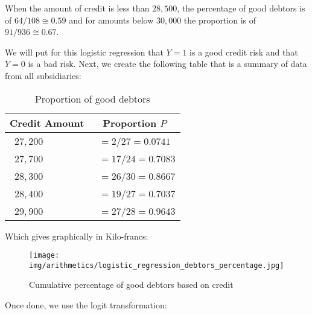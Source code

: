 	When the amount of credit is less than $28,500$, the percentage of good debtors is of $64/108 \cong 0.59$ and for amounts below $30,000$ the proportion is of $91/936\cong 0.67$.
	
	We will put for this logistic regression that $Y=1$ is a good credit risk and that $Y=0$ is a bad risk. Next, we create the following table that is a summary of data from all subsidiaries:
	\begin{table}[H]
		\begin{center}
			\begin{tabular}{|p{2cm}|p{4cm}|}
					\hline
					\multicolumn{1}{c}{\cellcolor{black!30}\textbf{Credit Amount}} & 
	  \multicolumn{1}{c}{\cellcolor{black!30}\textbf{Proportion $P$}} \\ \hline
					\centering\arraybackslash\ $27,200$ & \centering\arraybackslash\ $=2/27=0.0741$  \\ \hline
					\centering\arraybackslash\ $27,700$ & \centering\arraybackslash\ $=17/24=0.7083$ \\ \hline
					\centering\arraybackslash\ $28,300$ & \centering\arraybackslash\ $=26/30=0.8667$ \\ \hline
					\centering\arraybackslash\ $28,400$ & \centering\arraybackslash\ $=19/27=0.7037$ \\ \hline
					\centering\arraybackslash\ $29,900$ & \centering\arraybackslash\ $=27/28=0.9643$ \\ \hline
			\end{tabular}
		\end{center}
		\caption[]{Proportion of good debtors}
	\end{table}
	Which gives graphically in Kilo-francs:
	\begin{figure}[H]
		\centering
		\texttt{[image: img/arithmetics/logistic\_regression\_debtors\_percentage.jpg]}
		\caption{Cumulative percentage of good debtors based on credit}
	\end{figure}
	Once done, we use the logit transformation:
	
